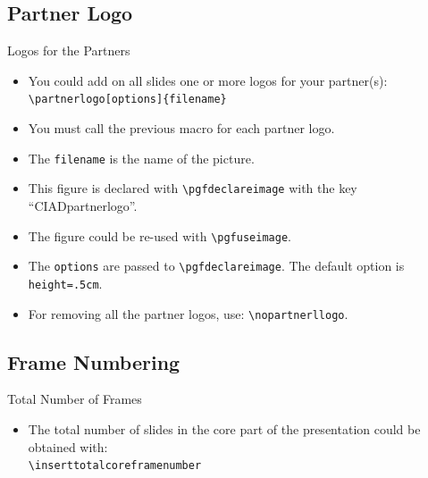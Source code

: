 \documentclass[english,sectioncirclenumberstyle]{ciadbeamer}
\begin{document}
\subsection{Partner Logo}

\begin{frame}{Logos for the Partners}
	\begin{itemize}
	\item You could add on all slides one or more logos for your partner(s): \\
		\texttt{{\textbackslash}partnerlogo[options]\{filename\}}
	\item You must call the previous macro for each partner logo.
	\item The \texttt{filename} is the name of the picture.
	\vspace{1em}
	\item This figure is declared with \texttt{{\textbackslash}pgfdeclareimage} with the key ``CIADpartnerlogo''.
	\item The figure could be re-used with \texttt{{\textbackslash}pgfuseimage}.
	\item The \texttt{options} are passed to \texttt{{\textbackslash}pgfdeclareimage}. The default option is \texttt{height=.5cm}.
	\item For removing all the partner logos, use: \texttt{{\textbackslash}nopartnerllogo}.
	\end{itemize}
\end{frame}



\subsection{Frame Numbering}

\begin{frame}{Total Number of Frames}
	\begin{itemize}
	\item The total number of slides in the core part of the presentation could be obtained with: \\
		\texttt{{\textbackslash}inserttotalcoreframenumber}
	\end{itemize}
\end{frame}
\end{document}
